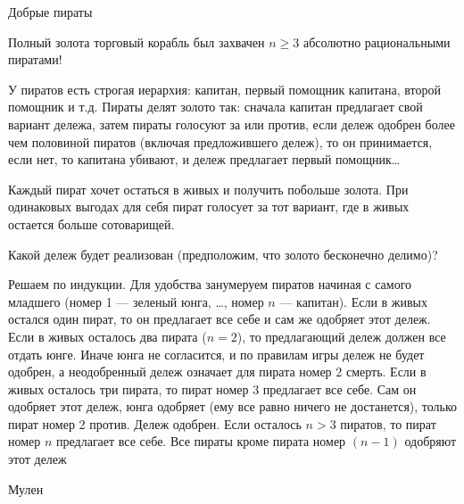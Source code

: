 \begin{problem}
 Добрые пираты  \par
Полный золота торговый корабль был захвачен  $n\ge 3$  абсолютно рациональными пиратами! \par
У пиратов есть строгая иерархия: капитан, первый помощник капитана, второй помощник и т.д. Пираты делят золото так: сначала капитан предлагает свой вариант дележа, затем пираты голосуют за или против, если дележ одобрен более чем половиной пиратов (включая предложившего дележ), то он принимается, если нет, то капитана убивают, и дележ предлагает первый помощник\ldots \par
Каждый пират хочет остаться в живых и получить побольше золота. При одинаковых выгодах для себя пират голосует за тот вариант, где в живых остается больше сотоварищей.\par
Какой дележ будет реализован (предположим, что золото бесконечно делимо)?



\begin{sol}
Решаем по индукции. Для удобства занумеруем пиратов начиная с самого младшего (номер 1 — зеленый юнга, \ldots , номер $n$ — капитан). Если в живых остался один пират, то он предлагает все себе и сам же одобряет этот дележ. Если в живых осталось два пирата ($n=2$), то предлагающий дележ должен все отдать юнге. Иначе юнга не согласится, и по правилам игры дележ не будет одобрен, а неодобренный дележ означает для пирата номер 2 смерть. Если в живых осталось три пирата, то пират номер 3 предлагает все себе. Сам он одобряет этот дележ, юнга одобряет (ему все равно ничего не достанется), только пират номер 2 против. Дележ одобрен. Если осталось $n>3$ пиратов, то пират номер $n$ предлагает все себе. Все пираты кроме пирата номер $(n-1)$ одобряют этот дележ
\end{sol}
\end{problem}


\begin{source}
Мулен
\end{source}



